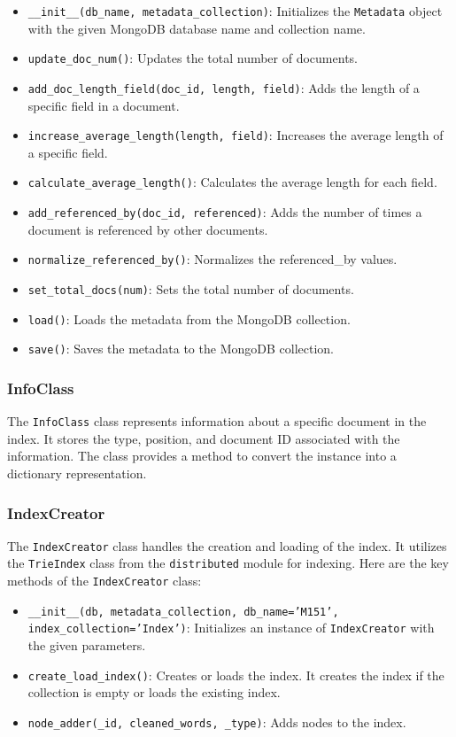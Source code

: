 \documentclass{article}
\begin{document}
\begin{itemize}
    \item \texttt{\_\_init\_\_(db\_name, metadata\_collection)}: Initializes the \texttt{Metadata} object with the given MongoDB database name and collection name.
    \item \texttt{update\_doc\_num()}: Updates the total number of documents.
    \item \texttt{add\_doc\_length\_field(doc\_id, length, field)}: Adds the length of a specific field in a document.
    \item \texttt{increase\_average\_length(length, field)}: Increases the average length of a specific field.
    \item \texttt{calculate\_average\_length()}: Calculates the average length for each field.
    \item \texttt{add\_referenced\_by(doc\_id, referenced)}: Adds the number of times a document is referenced by other documents.
    \item \texttt{normalize\_referenced\_by()}: Normalizes the referenced\_by values.
    \item \texttt{set\_total\_docs(num)}: Sets the total number of documents.
    \item \texttt{load()}: Loads the metadata from the MongoDB collection.
    \item \texttt{save()}: Saves the metadata to the MongoDB collection.
\end{itemize}

\subsubsection{InfoClass}

The \texttt{InfoClass} class represents information about a specific document in the index. It stores the type, position, and document ID associated with the information. The class provides a method to convert the instance into a dictionary representation.

\subsubsection{IndexCreator}

The \texttt{IndexCreator} class handles the creation and loading of the index. It utilizes the \texttt{TrieIndex} class from the \texttt{distributed} module for indexing. Here are the key methods of the \texttt{IndexCreator} class:

\begin{itemize}
    \item \texttt{\_\_init\_\_(db, metadata\_collection, db\_name='M151', index\_collection='Index')}: Initializes an instance of \texttt{IndexCreator} with the given parameters.
    \item \texttt{create\_load\_index()}: Creates or loads the index. It creates the index if the collection is empty or loads the existing index.
    \item \texttt{node\_adder(\_id, cleaned\_words, \_type)}: Adds nodes to the index.
\end{itemize}
\end{document}
